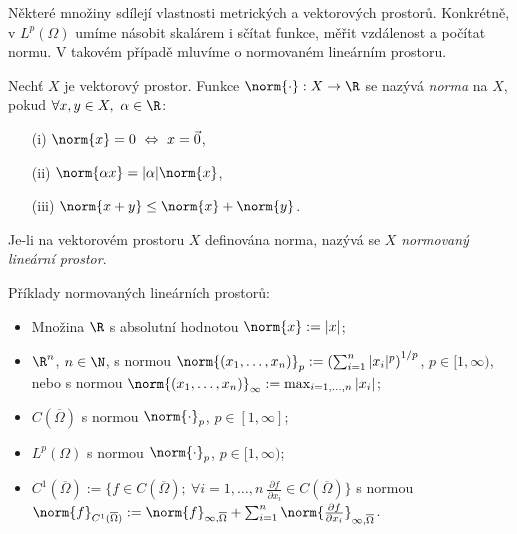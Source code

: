 Některé množiny sdílejí vlastnosti metrických a vektorových prostorů.
Konkrétně, v $L^p(\Omega)$ umíme násobit skalárem i sčítat funkce, měřit vzdálenost a počítat normu.
V takovém případě mluvíme o normovaném lineárním prostoru.
\begin{df}
Nechť $X$ je vektorový prostor. Funkce $\norm{\cdot}:X\to\R$ se nazývá \emph{norma} na $X$, pokud $\forall x,y\in X,~\alpha\in\R$:
\begin{itemize}
\item[(i)] $\norm{x}=0 ~\Leftrightarrow~x=\vec 0$,
\item[(ii)] $\norm{\alpha x}=|\alpha|\norm{x}$,
\item[(iii)] $\norm{x+y}\le\norm{x}+\norm{y}$.
\end{itemize}
Je-li na vektorovém prostoru $X$ definována norma, nazývá se $X$ \emph{normovaný lineární prostor}.
\end{df}

\begin{ex}
Příklady normovaných lineárních prostorů:
\begin{itemize}
\item Množina $\R$ s absolutní hodnotou $\norm{x}:=|x|$;
\item $\R^n$, $n\in\N$, s normou $\norm{(x_1,\ldots,x_n)}_p:=\left(\sum_{i=1}^n|x_i|^p\right)^{1/p}$, $p\in[1,\infty)$, nebo s normou $\norm{(x_1,\ldots,x_n)}_\infty:=\max_{i=1,\ldots,n}|x_i|$;
\item $C(\overline\Omega)$ s normou $\norm{\cdot}_p$, $p\in[1,\infty]$;
\item $L^p(\Omega)$ s normou $\norm{\cdot}_p$, $p\in[1,\infty)$;
\item $C^1(\overline\Omega):=\{f\in C(\overline\Omega);~\forall i=1,\ldots,n~\frac{\partial f}{\partial x_i}\in C(\overline\Omega)\}$ s normou $\norm{f}_{C^1(\overline\Omega)} := \norm{f}_{\infty,\overline\Omega} + \sum_{i=1}^n\norm{\frac{\partial f}{\partial x_i}}_{\infty,\overline\Omega}$.
\end{itemize}
\end{ex}

